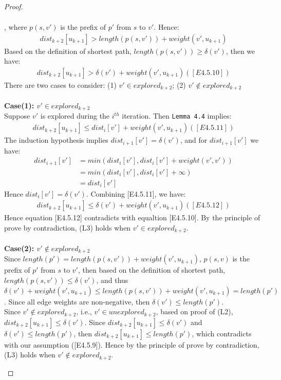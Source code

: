 \begin{proof}
\begin{itemize}
\begin{enumerate}
\begin{align*}
  \end{align*}
  , where $p(s, v')$ is the prefix of $p'$ from $s$ to $v'$. Hence: 
  \begin{align*}
   dist_{k+2}[u_{k+1}] > length(p(s, v')) + weight(v', u_{k+1}) 
  \end{align*}
  Based on the definition of shortest path, $length(p(s, v')) \geq \delta(v')$, then we have: 
  \begin{align*}
   dist_{k+2}[u_{k+1}] > \delta(v') + weight(v', u_{k+1}) ([E4.5.10])
  \end{align*}
  There are two cases to consider: (1) $v' \in explored_{k+2}$; (2) $v' \notin explored_{k+2}$
  \\\\
  \textbf{Case(1): $v' \in explored_{k+2}$}
  \\
  Suppose $v'$ is explored during the $i^{th}$ iteration. Then \texttt{Lemma 4.4} implies: 
  \begin{align*}
    dist_{k+2}[u_{k+1}] \leq dist_i[v'] + weight(v', u_{k+1}) ([E4.5.11])
  \end{align*}
  The induction hypothesis implies $dist_{i+1}[v'] = \delta(v')$, and for $dist_{i+1}[v']$ we have: 
  \begin{align*}
    dist_{i+1}[v'] &= min(dist_i[v'], dist_i[v'] + weight(v', v')) \\
                   &= min(dist_i[v'], dist_i[v'] + \infty) \\
                   &= dist_i[v']
  \end{align*}
  Hence $dist_i[v'] = \delta(v')$. Combining [E4.5.11], we have: 
  \begin{align*}
    dist_{k+2}[u_{k+1}] \leq \delta(v') + weight(v', u_{k+1}) ([E4.5.12])
  \end{align*}
  Hence equation [E4.5.12] contradicts with equaltion [E4.5.10]. By the principle of prove by contradiction, (L3) holds when $v' \in explored_{k+2}$. 
  \\\\
  \textbf{Case(2): $v' \notin explored_{k+2}$}
  \\
  Since $length(p') = length(p(s, v')) + weight(v', u_{k+1})$, $p(s, v)$ is the prefix of $p'$ from $s$ to $v'$, then based on the definition of shortest path, $length(p(s, v')) \leq \delta(v')$, and thus $\delta(v') + weight(v', u_{k+1}) \leq length(p(s, v')) + weight(v', u_{k+1}) = length(p')$. Since all edge weights are non-negative, then $\delta(v') \leq length(p')$.
  \\
  Since $v' \notin explored_{k+2}$, i.e., $v' \in unexplored_{k+2}$, based on proof of (L2), $dist_{k+2}[u_{k+1}] \leq \delta(v')$. Since $dist_{k+2}[u_{k+1}] \leq \delta(v')$ and $\delta(v') \leq length(p')$, then $dist_{k+2}[u_{k+1}] \leq length(p')$, which contradicts with our assumption ([E4.5.9]). Hence by the principle of prove by contradiction, (L3) holds when $v' \notin explored_{k+2}$. 

\end{enumerate}
\end{itemize}
\end{proof}
